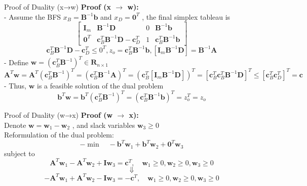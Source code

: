 \documentclass[aspectratio=169,hyperref,UTF8,CJK]{beamer}
\begin{document}
\begin{frame}{Proof of Duality (x→w)}
\textbf{Proof (x \(\rightarrow\) w):} \\
- Assume the BFS \(x_B = \mathbf{B}^{-1}\mathbf{b}\) and \(x_D = \mathbf{0}^T\) , the final simplex tableau is
\[
\left[ \begin{array}{ccc}\mathbf{I}_m & \mathbf{B}^{-1}\mathbf{D} & 0 & \mathbf{B}^{-1}\mathbf{b} \\ \mathbf{0}^T & \mathbf{c}_B^T\mathbf{B}^{-1}\mathbf{D} -\mathbf{c}_D^T & 1 & \mathbf{c}_B^T\mathbf{B}^{-1}\mathbf{b} \end{array} \right]
\]
\[
\mathbf{c}_B^T\mathbf{B}^{-1}\mathbf{D} - \mathbf{c}_D^T\leq 0^T,z_o = \mathbf{c}_B^T\mathbf{B}^{-1}\mathbf{b},\left[\mathbf{I}_m\mathbf{B}^{-1}\mathbf{D}\right] = \mathbf{B}^{-1}\mathbf{A}
\]
- Define \(\mathbf{w} = \left(\mathbf{c}_B^T\mathbf{B}^{-1}\right)^T \in \mathbf{R}_{n \times 1}\)
\[
\mathbf{A}^T\mathbf{w} = \mathbf{A}^T \left(\mathbf{c}_B^T\mathbf{B}^{-1}\right)^T = \left(\mathbf{c}_B^T\mathbf{B}^{-1}\mathbf{A}\right)^T = \left(\mathbf{c}_B^T \left[\mathbf{I}_m \mathbf{B}^{-1}\mathbf{D}\right]\right)^T = \left[\mathbf{c}_B^T \mathbf{c}_B^T\mathbf{B}^{-1}\mathbf{D}\right]^T \leq \left[\mathbf{c}_B^T \mathbf{c}_D^T\right]^T = \mathbf{c}
\]
- Thus, \(\mathbf{w}\) is a feasible solution of the dual problem
\[
\mathbf{b}^T\mathbf{w} = \mathbf{b}^T \left(\mathbf{c}_B^T\mathbf{B}^{-1}\right)^T = \left(\mathbf{c}_B^T\mathbf{B}^{-1}\mathbf{b}\right)^T = z_o^T = z_o
\]
\end{frame}

\begin{frame}{Proof of Duality (w→x)}
\textbf{Proof (w \(\rightarrow\) x):} \\
Denote \(\mathbf{w} = \mathbf{w}_{1} - \mathbf{w}_{2}\) , and slack variables \(\mathbf{w}_{3} \geq 0\) \\
Reformulation of the dual problem:
\[
-\min \quad -\mathbf{b}^{T}\mathbf{w}_{1} + \mathbf{b}^{T}\mathbf{w}_{2} + \mathbf{0}^{T}\mathbf{w}_{3}
\]
subject to
\[
\mathbf{A}^{T}\mathbf{w}_{1} - \mathbf{A}^{T}\mathbf{w}_{2} + \mathbf{I}\mathbf{w}_{3} = \mathbf{c}^{T}, \quad \mathbf{w}_{1}\geq 0,\mathbf{w}_{2}\geq 0,\mathbf{w}_{3}\geq 0
\]
\[
\Downarrow
\]
\[
-\mathbf{A}^{T}\mathbf{w}_{1} + \mathbf{A}^{T}\mathbf{w}_{2} - \mathbf{I}\mathbf{w}_{3} = -\mathbf{c}^{T}, \quad \mathbf{w}_{1}\geq 0,\mathbf{w}_{2}\geq 0,\mathbf{w}_{3}\geq 0
\]
\end{frame}
\end{document}
